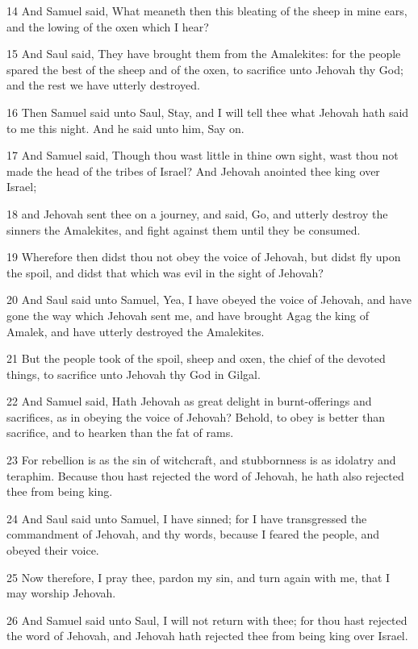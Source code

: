 \par 14 And Samuel said, What meaneth then this bleating of the sheep in mine ears, and the lowing of the oxen which I hear?
\par 15 And Saul said, They have brought them from the Amalekites: for the people spared the best of the sheep and of the oxen, to sacrifice unto Jehovah thy God; and the rest we have utterly destroyed.
\par 16 Then Samuel said unto Saul, Stay, and I will tell thee what Jehovah hath said to me this night. And he said unto him, Say on.
\par 17 And Samuel said, Though thou wast little in thine own sight, wast thou not made the head of the tribes of Israel? And Jehovah anointed thee king over Israel;
\par 18 and Jehovah sent thee on a journey, and said, Go, and utterly destroy the sinners the Amalekites, and fight against them until they be consumed.
\par 19 Wherefore then didst thou not obey the voice of Jehovah, but didst fly upon the spoil, and didst that which was evil in the sight of Jehovah?
\par 20 And Saul said unto Samuel, Yea, I have obeyed the voice of Jehovah, and have gone the way which Jehovah sent me, and have brought Agag the king of Amalek, and have utterly destroyed the Amalekites.
\par 21 But the people took of the spoil, sheep and oxen, the chief of the devoted things, to sacrifice unto Jehovah thy God in Gilgal.
\par 22 And Samuel said, Hath Jehovah as great delight in burnt-offerings and sacrifices, as in obeying the voice of Jehovah? Behold, to obey is better than sacrifice, and to hearken than the fat of rams.
\par 23 For rebellion is as the sin of witchcraft, and stubbornness is as idolatry and teraphim. Because thou hast rejected the word of Jehovah, he hath also rejected thee from being king.
\par 24 And Saul said unto Samuel, I have sinned; for I have transgressed the commandment of Jehovah, and thy words, because I feared the people, and obeyed their voice.
\par 25 Now therefore, I pray thee, pardon my sin, and turn again with me, that I may worship Jehovah.
\par 26 And Samuel said unto Saul, I will not return with thee; for thou hast rejected the word of Jehovah, and Jehovah hath rejected thee from being king over Israel.
